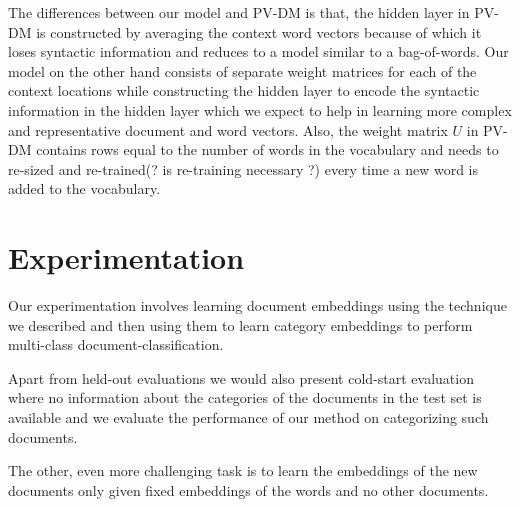 \documentclass{article}
\begin{document}
The differences between our model and PV-DM is that, the hidden layer in PV-DM is constructed by averaging the context word vectors because of which it loses syntactic information and reduces to a model similar to a bag-of-words. Our model on the other hand consists of separate weight matrices for each of the context locations while constructing the hidden layer to encode the syntactic information in the hidden layer which we expect to help in learning more complex and representative document and word vectors. 
Also, the weight matrix $U$ in PV-DM contains rows equal to the number of words in the vocabulary and needs to re-sized and re-trained(? is re-training necessary ?) every time a new word is added to the vocabulary.

\section{Experimentation}
Our experimentation involves learning document embeddings using the technique we described and then using them to learn category embeddings to perform multi-class document-classification.

Apart from held-out evaluations we would also present cold-start evaluation where no information about the categories of the documents in the test set is available and we evaluate the performance of our method on categorizing such documents.

The other, even more challenging task is to learn the embeddings of the new documents only given fixed embeddings of the words and no other documents.
\end{document}
